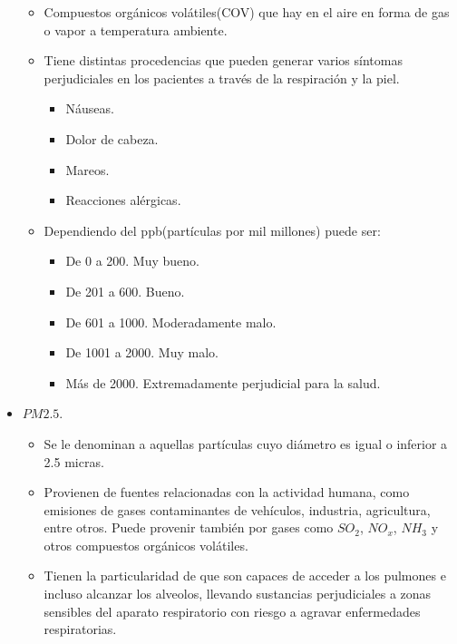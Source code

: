 \begin{itemize}
    		\begin{itemize}
    			\item Compuestos orgánicos volátiles(COV) que hay en el aire en forma de gas o vapor a temperatura ambiente.\cite{VOC_Niveles}
    			\item Tiene distintas procedencias que pueden generar varios síntomas perjudiciales en los pacientes a través de la respiración y la piel.\cite{VOC_Niveles}
    				\begin{itemize}
    					\item Náuseas.\cite{VOC_Niveles}
    					\item Dolor de cabeza.\cite{VOC_Niveles}
    					\item Mareos.\cite{VOC_Niveles}
    					\item Reacciones alérgicas.\cite{VOC_Niveles}
    				\end{itemize}
    			\item Dependiendo del ppb(partículas por mil millones) puede ser:
    				\begin{itemize}
    					\item De 0 a 200. Muy bueno.\cite{VOC_Niveles}
    					\item De 201 a 600. Bueno.\cite{VOC_Niveles}
    					\item De 601 a 1000. Moderadamente malo.\cite{VOC_Niveles}
    					\item De 1001 a 2000. Muy malo.\cite{VOC_Niveles}
    					\item Más de 2000. Extremadamente perjudicial para la salud.\cite{VOC_Niveles}
    				\end{itemize}
    		\end{itemize}
    	\item $PM2.5.$
    		\begin{itemize}
    			\item Se le denominan a aquellas partículas cuyo diámetro es igual o inferior a 2.5 micras\cite{Definicion_Particulas2.5}. 
    			\item Provienen de fuentes relacionadas con la actividad humana, como emisiones de gases contaminantes de vehículos, industria, agricultura, entre otros. Puede provenir también por gases como $SO_2$, $NO_x$, $NH_3$ y otros compuestos orgánicos volátiles.
    			\item Tienen la particularidad de que son capaces de acceder a los pulmones e incluso alcanzar los alveolos, llevando sustancias perjudiciales a zonas sensibles del aparato respiratorio con riesgo a agravar enfermedades respiratorias.\cite{Calidad_nivel_PM25}

\end{itemize}
\end{itemize}
